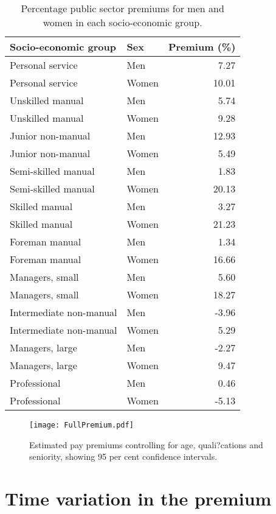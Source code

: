 \documentclass[a4paper,11pt,titlepage]{article}
\begin{document}
\begin{table}[ht]
    \caption{Percentage public sector premiums for men and women in each socio-economic group. \label{tab:fullprem}}
    \begin{center}
    \begin{tabular}{llr}
\toprule
     Socio-economic group & Sex & Premium (\%) \\
\midrule
  Personal service & Men & 7.27 \\
  Personal service & Women & 10.01 \\
  Unskilled manual & Men & 5.74 \\
  Unskilled manual & Women & 9.28 \\
  Junior non-manual & Men & 12.93 \\
  Junior non-manual & Women & 5.49 \\
  Semi-skilled manual& Men & 1.83 \\
  Semi-skilled manual & Women & 20.13 \\
  Skilled manual & Men & 3.27 \\
  Skilled manual & Women & 21.23 \\
  Foreman manual & Men & 1.34 \\
  Foreman manual & Women & 16.66 \\
  Managers, small & Men & 5.60 \\
  Managers, small & Women & 18.27 \\
  Intermediate non-manual& Men & -3.96 \\
  Intermediate non-manual & Women & 5.29 \\
  Managers, large & Men & -2.27 \\
  Managers, large & Women & 9.47 \\
  Professional& Men & 0.46 \\
  Professional& Women & -5.13 \\
\bottomrule
    \end{tabular}
    \end{center}
\end{table}

\begin{figure}
    \texttt{[image: FullPremium.pdf]}
    \caption{Estimated pay premiums controlling for age, quali?cations and seniority,
    showing 95 per cent confidence intervals.\label{fig:full}}
\end{figure}


\section{Time variation in the premium}
\end{document}
